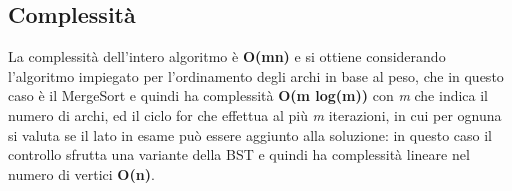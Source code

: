 \subsection{Complessità}
La complessità dell'intero algoritmo è \textbf{O(mn)} e si ottiene considerando l'algoritmo impiegato per l'ordinamento degli archi in base al peso, che in questo caso è il MergeSort e quindi ha complessità \textbf{O(m log(m))} con \emph{m} che indica il numero di archi, ed il ciclo for che effettua al più \emph{m} iterazioni, in cui per ognuna si valuta se il lato in esame può essere aggiunto alla soluzione: in questo caso il controllo sfrutta una variante della BST e quindi ha complessità lineare nel numero di vertici \textbf{O(n)}.

\pagebreak